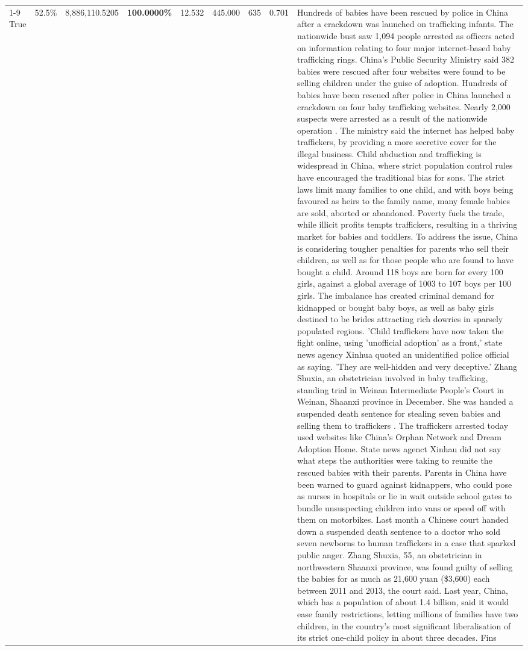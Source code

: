 \begin{table}[H]
\begin{tabular}{lllrlllll}
\cline{1-9}
True & 52.5\% & 8,886,110.5205 & \bfseries \color{red} 100.0000\% & 12.532 & 445.000 & 635 & 0.701 & Hundreds of babies have been rescued by police in China after a crackdown was launched on trafficking infants. The nationwide bust saw 1,094 people arrested as officers acted on information relating to four major internet-based baby trafficking rings. China's Public Security Ministry said 382 babies were rescued after four websites were found to be selling children under the guise of adoption. Hundreds of babies have been rescued after police in China launched a crackdown on four baby trafficking websites. Nearly 2,000 suspects were arrested as a result of the nationwide operation . The ministry said the internet has helped baby traffickers, by providing a more secretive cover for the illegal business. Child abduction and trafficking is widespread in China, where strict population control rules have encouraged the traditional bias for sons. The strict laws limit many families to one child, and with boys being favoured as heirs to the family name, many female babies are sold, aborted or abandoned. Poverty fuels the trade, while illicit profits tempts traffickers, resulting in a thriving market for babies and toddlers. To address the issue, China is considering tougher penalties for parents who sell their children, as well as for those people who are found to have bought a child. Around 118 boys are born for every 100 girls, against a global average of 1003 to 107 boys per 100 girls. The imbalance has created criminal demand for kidnapped or bought baby boys, as well as baby girls destined to be brides attracting rich dowries in sparsely populated regions. 'Child traffickers have now taken the fight online, using 'unofficial adoption' as a front,' state news agency Xinhua quoted an unidentified police official as saying. 'They are well-hidden and very deceptive.' Zhang Shuxia, an obstetrician involved in baby trafficking, standing trial in Weinan Intermediate People's Court in Weinan, Shaanxi province in December. She was handed a suspended death sentence for stealing seven babies and selling them to traffickers . The traffickers arrested today used websites like China's Orphan Network and Dream Adoption Home. State news agenct Xinhau did not say what steps the authorities were taking to reunite the rescued babies with their parents. Parents in China have been warned to guard against kidnappers, who could pose as nurses in hospitals or lie in wait outside school gates to bundle unsuspecting children into vans or speed off with them on motorbikes. Last month a Chinese court handed down a suspended death sentence to a doctor who sold seven newborns to human traffickers in a case that sparked public anger. Zhang Shuxia, 55, an obstetrician in northwestern Shaanxi province, was found guilty of selling the babies for as much as 21,600 yuan (\$3,600) each between 2011 and 2013, the court said. Last year, China, which has a population of about 1.4 billion, said it would ease family restrictions, letting millions of families have two children, in the country's most significant liberalisation of its strict one-child policy in about three decades. Fins \\

\end{tabular}
\end{table}
